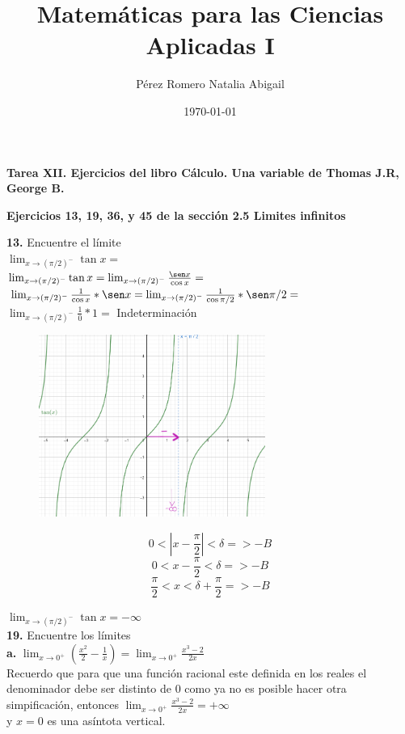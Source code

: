 \documentclass[12pt, letterpaper]{article}
\title{Matemáticas para las Ciencias Aplicadas I}
\author{Pérez Romero Natalia Abigail}
\date{\today}
\begin{document}
\maketitle
\textbf{Tarea XII. Ejercicios del libro Cálculo. Una variable de Thomas J.R, George B.}

\textbf{Ejercicios 13, 19, 36, y 45 de  la sección 2.5 Limites infinitos}

\textbf{13.} Encuentre el límite\\

 $\lim_{ x \to (\pi/2)^-} \tan x  = $\\

$\lim_{ x \to (\pi/2)^-} \tan x  = \lim_{ x \to (\pi/2)^-} \frac{\sen x}{\cos x} =$\\
$\lim_{ x \to (\pi/2)^-} \frac{1}{\cos x} * \sen x = \lim_{ x \to (\pi/2)^-} \frac{1}{\cos \pi/2} * \sen \pi /2 =$\\
$ \lim_{ x \to (\pi/2)^-} \frac{1}{0} * 1 = $ Indeterminación


\begin{figure}[tbh]
\centering
\includegraphics[width=20em]{t12uno}
\end{figure}

$$0 < |x - \frac{\pi}{2}| < \delta => -B$$
$$0 < x - \frac{\pi}{2} < \delta => -B$$
$$ \frac{\pi}{2} < x < \delta + \frac{\pi}{2}  => -B$$

 $\lim_{ x \to (\pi/2)^-} \tan x  = - \infty $\\

\textbf{19.} Encuentre los límites\\
\textbf{a. } $\lim_{ x \to 0^+} (\frac{x^2}{2}-\frac{1}{x}) = \lim_{ x \to 0^+} \frac{x^3-2}{2x}$\\
Recuerdo que para que una función racional este definida en los reales el denominador debe ser distinto de 0 como ya no es posible hacer otra simpificación, entonces $ \lim_{ x \to 0^+} \frac{x^3-2}{2x} = + \infty$\\
y $x= 0$ es una asíntota vertical.\\
\end{document}
